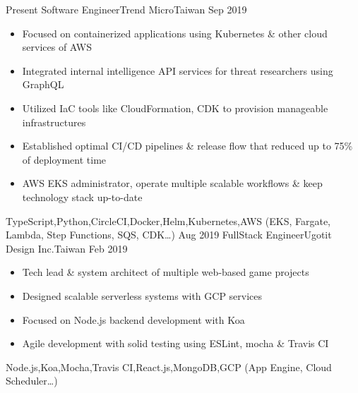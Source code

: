\begin{experiences}
  \experience
    {Present}       {Software Engineer}{Trend Micro}{Taiwan}
    {Sep 2019}      {
                      \begin{itemize}
                        \item{Focused on containerized applications using Kubernetes \& other cloud services of AWS}
                        \item{Integrated internal intelligence API services for threat researchers using GraphQL}
                        \item{Utilized IaC tools like CloudFormation, CDK to provision manageable infrastructures}
                        \item{Established optimal CI/CD pipelines \& release flow that reduced up to 75\% of deployment time}
                        \item{AWS EKS administrator, operate multiple scalable workflows \& keep technology stack up-to-date}
                      \end{itemize}
                    }
                    {TypeScript,Python,CircleCI,Docker,Helm,Kubernetes,{AWS (EKS, Fargate, Lambda, Step Functions, SQS, CDK\ldots)}}
  \emptySeparator
  \experience
    {Aug 2019}      {FullStack Engineer}{Ugotit Design Inc.}{Taiwan}
    {Feb 2019}      {
                      \begin{itemize}
                        \item{Tech lead \& system architect of multiple web‐based game projects}
                        \item{Designed scalable serverless systems with GCP services}
                        \item{Focused on Node.js backend development with Koa}
                        \item{Agile development with solid testing using ESLint, mocha \& Travis CI}
                      \end{itemize}
                    }
                    {Node.js,Koa,Mocha,Travis CI,React.js,MongoDB,{GCP (App Engine, Cloud Scheduler\ldots)}}
\end{experiences}

